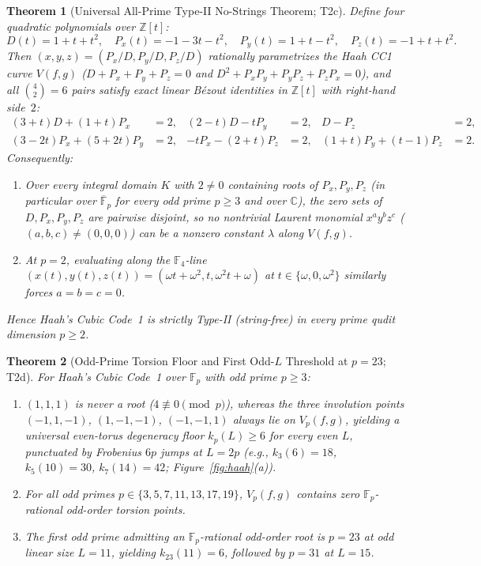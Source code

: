 \documentclass[11pt,reqno]{amsart}
\newtheorem{theorem}{Theorem}[section]
\theoremstyle{definition}
\newcommand{\Z}{\mathbb{Z}}
\newcommand{\C}{\mathbb{C}}
\newcommand{\F}{\mathbb{F}}
\begin{document}
\begin{theorem}[Universal All-Prime Type-II No-Strings Theorem; \textsf{T2c}]
\label{thm:t2c}
Define four quadratic polynomials over $\Z[t]$:
\[
  D(t) = 1 + t + t^2, \quad
  P_x(t) = -1 - 3t - t^2, \quad
  P_y(t) = 1 + t - t^2, \quad
  P_z(t) = -1 + t + t^2.
\]
Then $(x, y, z) = (P_x/D, P_y/D, P_z/D)$ rationally parametrizes the Haah CC1 curve
$V(f,g)$ ($D + P_x + P_y + P_z = 0$ and $D^2 + P_x P_y + P_y P_z + P_z P_x = 0$), and all
$\binom{4}{2} = 6$ pairs satisfy exact linear B\'ezout identities in $\Z[t]$ with right-hand side~$2$:
\begin{align*}
  (3+t)D + (1+t)P_x &= 2, & (2-t)D - t P_y &= 2, & D - P_z &= 2, \\
  (3-2t)P_x + (5+2t)P_y &= 2, & -t P_x - (2+t)P_z &= 2, & (1+t)P_y + (t-1)P_z &= 2.
\end{align*}
Consequently:
\begin{enumerate}[leftmargin=2em]
  \item Over \emph{every} integral domain $K$ with $2 \neq 0$ containing roots of $P_x, P_y, P_z$
    (in particular over $\overline{\F}_p$ for every odd prime $p \ge 3$ and over $\C$), the zero
    sets of $D, P_x, P_y, P_z$ are pairwise disjoint, so no nontrivial Laurent monomial
    $x^a y^b z^c$ ($(a,b,c) \neq (0,0,0)$) can be a nonzero constant $\lambda$ along $V(f,g)$.
  \item At $p = 2$, evaluating along the $\F_4$-line $(x(t),y(t),z(t)) = (\omega t + \omega^2, t, \omega^2 t + \omega)$
    at $t \in \{\omega, 0, \omega^2\}$ similarly forces $a = b = c = 0$.
\end{enumerate}
Hence Haah's Cubic Code~1 is strictly Type-II (string-free) in every prime qudit dimension $p \ge 2$.
\end{theorem}

\begin{theorem}[Odd-Prime Torsion Floor and First Odd-$L$ Threshold at $p=23$; \textsf{T2d}]
\label{thm:t2d}
For Haah's Cubic Code~1 over $\F_p$ with odd prime $p \ge 3$:
\begin{enumerate}[leftmargin=2em]
  \item $(1,1,1)$ is never a root ($4 \not\equiv 0 \pmod{p}$), whereas the three involution points
    $(-1,1,-1)$, $(1,-1,-1)$, $(-1,-1,1)$ always lie on $V_p(f,g)$, yielding a universal even-torus
    degeneracy floor $k_p(L) \ge 6$ for every even $L$, punctuated by Frobenius $6p$ jumps at $L = 2p$
    (e.g., $k_3(6)=18$, $k_5(10)=30$, $k_7(14)=42$; Figure~\ref{fig:haah}(a)).
  \item For all odd primes $p \in \{3, 5, 7, 11, 13, 17, 19\}$, $V_p(f,g)$ contains \emph{zero}
    $\F_p$-rational odd-order torsion points.
  \item The first odd prime admitting an $\F_p$-rational odd-order root is $p = 23$ at odd linear
    size $L = 11$, yielding $k_{23}(11) = 6$, followed by $p = 31$ at $L = 15$.
\end{enumerate}
\end{theorem}
\end{document}
